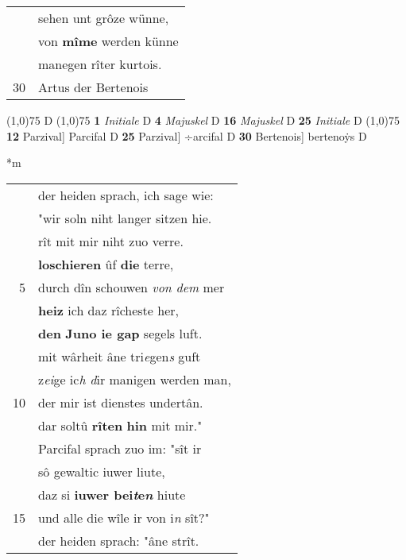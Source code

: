 \documentclass[8pt,a4paper,notitlepage]{article}
\begin{document}
\begin{table}[ht]
\begin{minipage}[t]{0.5\linewidth}
\begin{tabular}{rl}
 & sehen unt grôze wünne,\\ 
 & von \textbf{mîme} werden künne\\ 
 & manegen rîter kurtois.\\ 
30 & Artus der Bertenois\\ 
\end{tabular}
\scriptsize
\line(1,0){75} \newline
D \newline
\line(1,0){75} \newline
\textbf{1} \textit{Initiale} D  \textbf{4} \textit{Majuskel} D  \textbf{16} \textit{Majuskel} D  \textbf{25} \textit{Initiale} D  \newline
\line(1,0){75} \newline
\textbf{12} Parzival] Parcifal D \textbf{25} Parzival] ÷arcifal D \textbf{30} Bertenois] bertenoẏs D \newline
\end{minipage}
\hspace{0.5cm}
\begin{minipage}[t]{0.5\linewidth}
\small
\begin{center}*m
\end{center}
\begin{tabular}{rl}
 & der heiden sprach, ich sage wie:\\ 
 & "wir soln niht langer sitzen hie.\\ 
 & rît mit mir niht zuo verre.\\ 
 & \textbf{loschieren} ûf \textbf{die} terre,\\ 
5 & durch dîn schouwen \textit{von dem} mer\\ 
 & \textbf{heiz} ich daz rîcheste her,\\ 
 & \textbf{den} \textbf{Juno ie gap} segels luft.\\ 
 & mit wârheit âne tri\textit{e}gen\textit{s} guft\\ 
 & z\textit{ei}ge ic\textit{h d}ir manigen werden man,\\ 
10 & der mir ist dienstes undertân.\\ 
 & dar soltû \textbf{rîten} \textbf{hin} mit mir."\\ 
 & Parcifal sprach zuo im: "sît ir\\ 
 & sô gewaltic iuwer liute,\\ 
 & daz si \textbf{iuwer bei\textit{t}e\textit{n}} hiute\\ 
15 & und alle die wîle ir von i\textit{n} sît?"\\ 
 & der heiden sprach: "âne strît.\\ 

\end{tabular}
\end{minipage}
\end{table}
\end{document}
